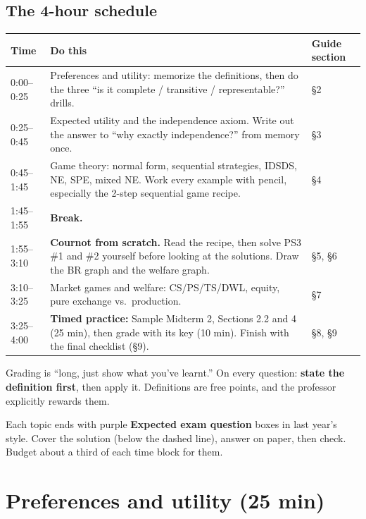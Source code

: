 \documentclass[11pt]{article}
\begin{document}
\subsection*{The 4-hour schedule}
\begin{center}
\renewcommand{\arraystretch}{1.25}
\begin{tabular}{@{}p{2.1cm}p{9.4cm}p{3.2cm}@{}}
\toprule
\textbf{Time} & \textbf{Do this} & \textbf{Guide section}\\\midrule
0:00--0:25 & Preferences and utility: memorize the definitions, then do the three ``is it complete / transitive / representable?'' drills. & \S2\\
0:25--0:45 & Expected utility and the independence axiom. Write out the answer to ``why exactly independence?'' from memory once. & \S3\\
0:45--1:45 & Game theory: normal form, sequential strategies, IDSDS, NE, SPE, mixed NE. Work every example with pencil, especially the 2-step sequential game recipe. & \S4\\
1:45--1:55 & \textbf{Break.} & \\
1:55--3:10 & \textbf{Cournot from scratch.} Read the recipe, then solve PS3 \#1 and \#2 yourself before looking at the solutions. Draw the BR graph and the welfare graph. & \S5, \S6\\
3:10--3:25 & Market games and welfare: CS/PS/TS/DWL, equity, pure exchange vs.\ production. & \S7\\
3:25--4:00 & \textbf{Timed practice:} Sample Midterm 2, Sections 2.2 and 4 (25 min), then grade with its key (10 min). Finish with the final checklist (\S9). & \S8, \S9\\
\bottomrule
\end{tabular}
\end{center}

\begin{tipbox}
Grading is ``long, just show what you've learnt.'' On every question: \textbf{state the definition first}, then apply it. Definitions are free points, and the professor explicitly rewards them.

Each topic ends with purple \textbf{Expected exam question} boxes in last year's style. Cover the solution (below the dashed line), answer on paper, then check. Budget about a third of each time block for them.
\end{tipbox}

\section{Preferences and utility (25 min)}
\end{document}
